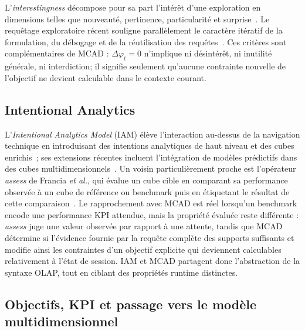 \documentclass[journal]{IEEEtran}
\begin{document}
L'\emph{interestingness} décompose pour sa part l'intérêt d'une exploration en dimensions telles que nouveauté, pertinence, particularité et surprise~\cite{GkitsakisEtAl2024}. Le requêtage exploratoire récent souligne parallèlement le caractère itératif de la formulation, du débogage et de la réutilisation des requêtes~\cite{ArenasExploratory2025}. Ces critères sont complémentaires de MCAD : $\Delta\varphi_t=0$ n'implique ni désintérêt, ni inutilité générale, ni interdiction; il signifie seulement qu'aucune contrainte nouvelle de l'objectif ne devient calculable dans le contexte courant.

\subsection{Intentional Analytics}

L'\emph{Intentional Analytics Model} (IAM) élève l'interaction au-dessus de la navigation technique en introduisant des intentions analytiques de haut niveau et des cubes enrichis~\cite{VassiliadisMarcelRizzi2019}; ses extensions récentes incluent l'intégration de modèles prédictifs dans des cubes multidimensionnels~\cite{FranciaPredict2026}. Un voisin particulièrement proche est l'opérateur \emph{assess} de Francia \emph{et al.}, qui évalue un cube cible en comparant sa performance observée à un cube de référence ou benchmark puis en étiquetant le résultat de cette comparaison~\cite{FranciaAssess2021}. Le rapprochement avec MCAD est réel lorsqu'un benchmark encode une performance KPI attendue, mais la propriété évaluée reste différente : \emph{assess} juge une valeur observée par rapport à une attente, tandis que MCAD détermine si l'évidence fournie par la requête complète des supports suffisants et modifie ainsi les contraintes d'un objectif explicite qui deviennent calculables relativement à l'état de session. IAM et MCAD partagent donc l'abstraction de la syntaxe OLAP, tout en ciblant des propriétés runtime distinctes.

\subsection{Objectifs, KPI et passage vers le modèle multidimensionnel}
\end{document}
